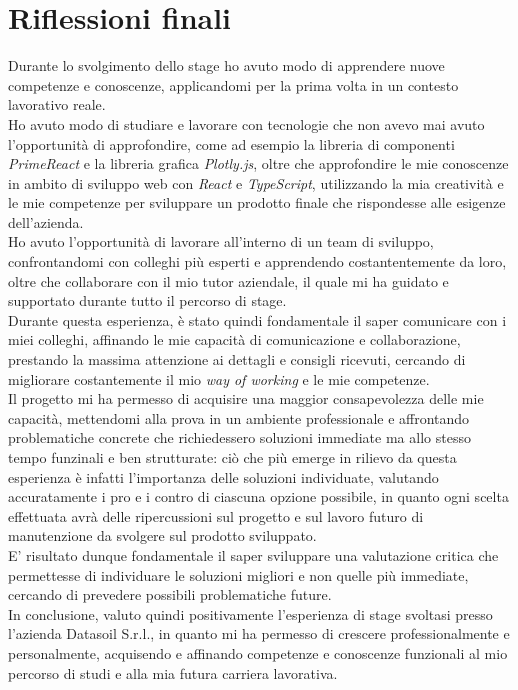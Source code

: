 \section{Riflessioni finali}
Durante lo svolgimento dello stage ho avuto modo di apprendere nuove competenze e conoscenze, applicandomi per la prima volta in un contesto lavorativo reale. \\
Ho avuto modo di studiare e lavorare con tecnologie che non avevo mai avuto l'opportunità di approfondire, come ad esempio la libreria di componenti \textit{PrimeReact} e la
libreria grafica \textit{Plotly.js}, oltre che approfondire le mie conoscenze in ambito di sviluppo web con \textit{React} e \textit{TypeScript}, utilizzando la mia
creatività e le mie competenze per sviluppare un prodotto finale che rispondesse alle esigenze dell'azienda. \\
Ho avuto l'opportunità di lavorare all'interno di un team di sviluppo, confrontandomi con colleghi più esperti e apprendendo costantentemente da loro, oltre che collaborare
con il mio tutor aziendale, il quale mi ha guidato e supportato durante tutto il percorso di stage. \\
Durante questa esperienza, è stato quindi fondamentale il saper comunicare con i miei colleghi, affinando le mie capacità di comunicazione e collaborazione, prestando la massima
attenzione ai dettagli e consigli ricevuti, cercando di migliorare costantemente il mio \textit{way of working} e le mie competenze. \\
Il progetto mi ha permesso di acquisire una maggior consapevolezza delle mie capacità, mettendomi alla prova in un ambiente professionale e affrontando problematiche concrete
che richiedessero soluzioni immediate ma allo stesso tempo funzinali e ben strutturate: ciò che più emerge in rilievo da questa esperienza è infatti l'importanza delle soluzioni individuate,
valutando accuratamente i pro e i contro di ciascuna opzione possibile, in quanto ogni scelta effettuata avrà delle ripercussioni sul progetto e sul lavoro futuro di manutenzione da svolgere
sul prodotto sviluppato. \\
E' risultato dunque fondamentale il saper sviluppare una valutazione critica che permettesse di individuare le soluzioni migliori e non quelle più immediate, cercando di prevedere
possibili problematiche future. \\
In conclusione, valuto quindi positivamente l'esperienza di stage svoltasi presso l'azienda Datasoil S.r.l., in quanto mi ha permesso di crescere professionalmente e personalmente,
acquisendo e affinando competenze e conoscenze funzionali al mio percorso di studi e alla mia futura carriera lavorativa.